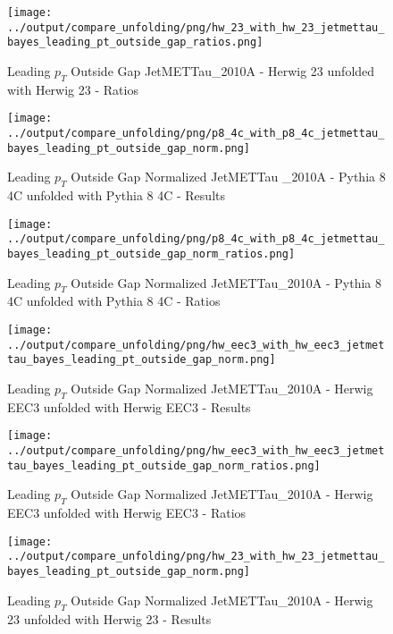 \documentclass[11pt]{book}
\begin{document}
\begin{figure}[ht]
\centering
\texttt{[image: ../output/compare\_unfolding/png/hw\_23\_with\_hw\_23\_jetmettau\_bayes\_leading\_pt\_outside\_gap\_ratios.png]}
\caption{Leading $p_{T}$ Outside Gap JetMETTau\_2010A - Herwig 23 unfolded with Herwig 23 - Ratios}
\label{hw_23_hw_23_jetmettau_bayes_leading_pt_outside_gap_b}
\end{figure}


\begin{figure}[ht]
\centering
\texttt{[image: ../output/compare\_unfolding/png/p8\_4c\_with\_p8\_4c\_jetmettau\_bayes\_leading\_pt\_outside\_gap\_norm.png]}
\caption{Leading $p_{T}$ Outside Gap Normalized JetMETTau \_2010A - Pythia 8 4C unfolded with Pythia 8 4C - Results}
\label{p8_p8_jetmettau_bayes_leading_pt_outside_gap_norm_a}
\end{figure}

\begin{figure}[ht]
\centering
\texttt{[image: ../output/compare\_unfolding/png/p8\_4c\_with\_p8\_4c\_jetmettau\_bayes\_leading\_pt\_outside\_gap\_norm\_ratios.png]}
\caption{Leading $p_{T}$ Outside Gap Normalized JetMETTau\_2010A - Pythia 8 4C unfolded with Pythia 8 4C - Ratios}
\label{p8_p8_jetmettau_bayes_leading_pt_outside_gap_norm_b}
\end{figure}

\begin{figure}[ht]
\centering
\texttt{[image: ../output/compare\_unfolding/png/hw\_eec3\_with\_hw\_eec3\_jetmettau\_bayes\_leading\_pt\_outside\_gap\_norm.png]}
\caption{Leading $p_{T}$ Outside Gap Normalized JetMETTau\_2010A - Herwig EEC3 unfolded with Herwig EEC3 - Results}
\label{hw_eec3_hw_eec3_jetmettau_bayes_leading_pt_outside_gap_norm_a}
\end{figure}

\begin{figure}[ht]
\centering
\texttt{[image: ../output/compare\_unfolding/png/hw\_eec3\_with\_hw\_eec3\_jetmettau\_bayes\_leading\_pt\_outside\_gap\_norm\_ratios.png]}
\caption{Leading $p_{T}$ Outside Gap Normalized JetMETTau\_2010A - Herwig EEC3 unfolded with Herwig EEC3 - Ratios}
\label{hw_eec3_hw_eec3_jetmettau_bayes_leading_pt_outside_gap_norm_b}
\end{figure}

\begin{figure}[ht]
\centering
\texttt{[image: ../output/compare\_unfolding/png/hw\_23\_with\_hw\_23\_jetmettau\_bayes\_leading\_pt\_outside\_gap\_norm.png]}
\caption{Leading $p_{T}$ Outside Gap Normalized JetMETTau\_2010A - Herwig 23 unfolded with Herwig 23 - Results}
\label{hw_23_hw_23_jetmettau_bayes_leading_pt_outside_gap_norm_a}
\end{figure}
\end{document}
